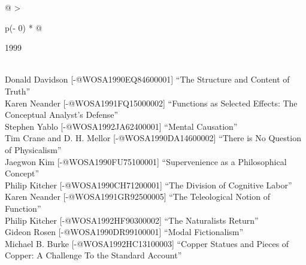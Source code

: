 \documentclass[
  10pt,
  letterpaper,
  DIV=11,
  numbers=noendperiod,
  twoside]{scrartcl}
\begin{document}
\begin{longtable}[]{@{}
  >{\raggedright\arraybackslash}p{(\columnwidth - 0\tabcolsep) * }@{}}

\caption{\label{tbl-top-ten-1990}Most cited articles published less than
ten years ago as of 1999.}

\tabularnewline

\toprule\noalign{}
\begin{minipage}[b]{\linewidth}\raggedright
1999
\end{minipage} \\
\midrule\noalign{}
\endhead
\bottomrule\noalign{}
\endlastfoot
Donald Davidson {[}-@WOSA1990EQ84600001{]} ``The Structure and Content
of Truth'' \\
Karen Neander {[}-@WOSA1991FQ15000002{]} ``Functions as Selected
Effects: The Conceptual Analyst's Defense'' \\
Stephen Yablo {[}-@WOSA1992JA62400001{]} ``Mental Causation'' \\
Tim Crane and D. H. Mellor {[}-@WOSA1990DA14600002{]} ``There is No
Question of Physicalism'' \\
Jaegwon Kim {[}-@WOSA1990FU75100001{]} ``Supervenience as a
Philosophical Concept'' \\
Philip Kitcher {[}-@WOSA1990CH71200001{]} ``The Division of Cognitive
Labor'' \\
Karen Neander {[}-@WOSA1991GR92500005{]} ``The Teleological Notion of
Function'' \\
Philip Kitcher {[}-@WOSA1992HF90300002{]} ``The Naturalists Return'' \\
Gideon Rosen {[}-@WOSA1990DR99100001{]} ``Modal Fictionalism'' \\
Michael B. Burke {[}-@WOSA1992HC13100003{]} ``Copper Statues and Pieces
of Copper: A Challenge To the Standard Account'' \\

\end{longtable}
\end{document}
